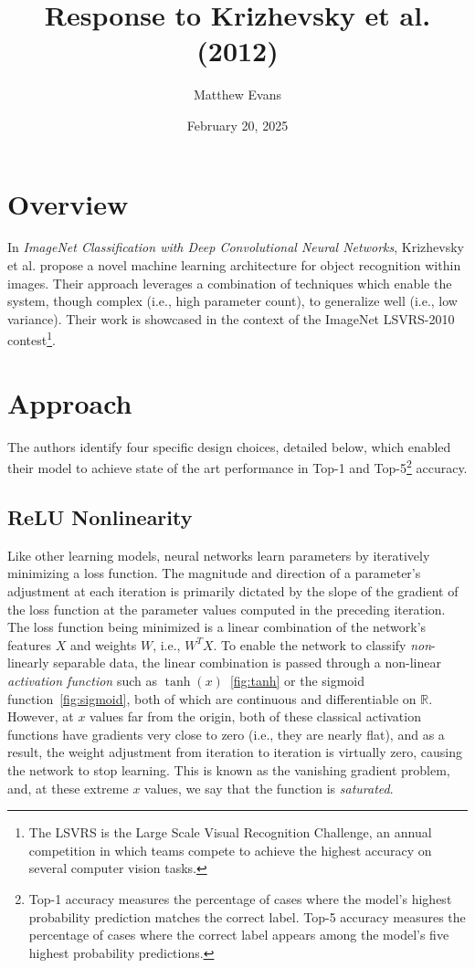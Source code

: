 \documentclass[10pt]{article}
\title{
    Response to Krizhevsky et al. (2012) \\
}
\author{Matthew Evans}
\date{February 20, 2025}
\begin{document}
\maketitle

\section*{Overview}
In \textit{ImageNet Classification with Deep Convolutional Neural Networks}, Krizhevsky et al.\cite{NIPS2012_c399862d} propose a novel machine learning architecture for object recognition within images. Their approach leverages a combination of techniques which enable the system, though complex (i.e., high parameter count), to generalize well (i.e., low variance). Their work is showcased in the context of the ImageNet LSVRS-2010 contest\footnote{The LSVRS is the Large Scale Visual Recognition Challenge, an annual competition in which teams compete to achieve the highest accuracy on several computer vision tasks.}.

\section*{Approach}
The authors identify four specific design choices, detailed below, which enabled their model to achieve state of the art performance in Top-1 and Top-5\footnote{Top-1 accuracy measures the percentage of cases where the model's highest probability prediction matches the correct label. Top-5 accuracy measures the percentage of cases where the correct label appears among the model's five highest probability predictions.} accuracy.

\subsection*{ReLU Nonlinearity}
Like other learning models, neural networks learn parameters by iteratively minimizing a loss function. The magnitude and direction of a parameter's adjustment at each iteration is primarily dictated by the slope of the gradient of the loss function at the parameter values computed in the preceding iteration. The loss function being minimized is a linear combination of the network's features \(X\) and weights \(W\), i.e., \(W^TX\). To enable the network to classify \textit{non}-linearly separable data, the linear combination is passed through a non-linear \textit{activation function} such as \(\tanh(x)\)~\ref{fig:tanh} or the sigmoid function~\ref{fig:sigmoid}, both of which are continuous and differentiable on \(\mathbb{R}\). However, at \(x\) values far from the origin, both of these classical activation functions have gradients very close to zero (i.e., they are nearly flat), and as a result, the weight adjustment from iteration to iteration is virtually zero, causing the network to stop learning. This is known as the vanishing gradient problem, and, at these extreme \(x\) values, we say that the function is \textit{saturated}.
\end{document}
